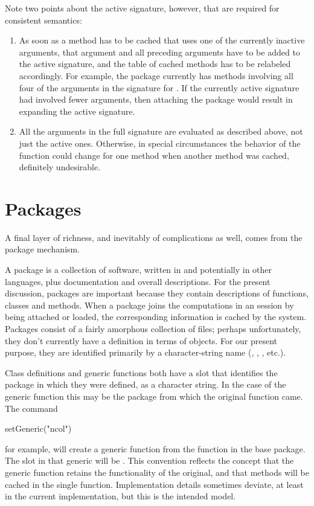 \documentclass[11pt]{article}
\begin{document}
Note two points about the active signature, however, that are required for consistent semantics:
\begin{enumerate}
\item As soon as a method has to be cached that uses one of the currently inactive arguments, that argument and all preceding arguments have to be added to the active signature, and the table of cached methods has to be relabeled accordingly.
For example, the  package currently has methods involving all four of the arguments in the signature for \SOperator{[}.  If the currently active signature had involved fewer arguments, then attaching the  package would result in expanding the active signature.
\item All the arguments in the full signature are evaluated as described above, not just the active ones.  Otherwise, in special circumstances the behavior of the function could change for one method when another method was cached, definitely undesirable.
\end{enumerate}

\section{Packages}
\label{sec:packages}

A final layer of richness, and inevitably of complications as well, comes from the \R{} package mechanism.

A package is a collection of software, written in \R{} and potentially in other languages, plus documentation and overall descriptions.
For the present discussion, packages are important because they contain descriptions of functions, classes and methods.
When a package joins the computations in an \R{} session by being attached or loaded, the corresponding information is cached by the \R{} system.
Packages consist of a fairly amorphous collection of files; perhaps unfortunately, they don't currently have a definition in terms of objects.
For our present purpose, they are identified primarily by a character-string name (, , , etc.).

Class definitions and generic functions both have a  slot that identifies the package in which they were defined, as a character string.
In the case of the generic function this may be the package from which the original function came.
The command
\begin{Example}
setGeneric("ncol")
\end{Example}
for example, will create a generic function from the function  in the base package.  The  slot in that generic will be .
This convention reflects the concept that the generic function retains the functionality of the original, and that methods will be cached in the single function.
Implementation details sometimes deviate, at least in the current implementation, but this is the intended model.
\end{document}
